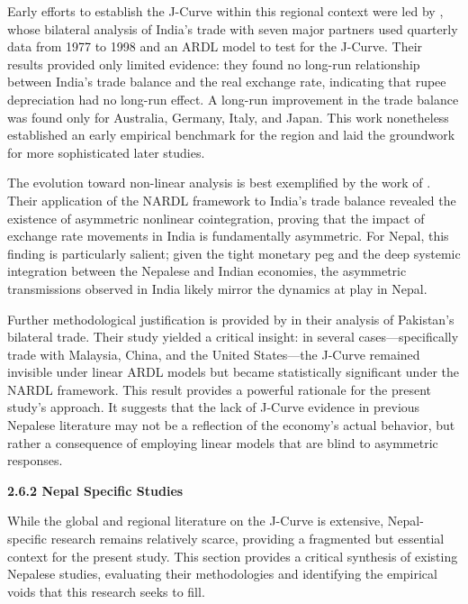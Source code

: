 \documentclass[12pt]{article}
\begin{document}
Early efforts to establish the J-Curve within this regional context were led by \textcite{Arora2003-yu}, whose bilateral analysis of India's trade with seven major partners used quarterly data from 1977 to 1998 and an ARDL model to test for the J-Curve. Their results provided only limited evidence: they found no long-run relationship between India's trade balance and the real exchange rate, indicating that rupee depreciation had no long-run effect. A long-run improvement in the trade balance was found only for Australia, Germany, Italy, and Japan. This work nonetheless established an early empirical benchmark for the region and laid the groundwork for more sophisticated later studies.

The evolution toward non-linear analysis is best exemplified by the work of \textcite{Bhat2021-ux}. Their application of the NARDL framework to India's trade balance revealed the existence of asymmetric nonlinear cointegration, proving that the impact of exchange rate movements in India is fundamentally asymmetric. For Nepal, this finding is particularly salient; given the tight monetary peg and the deep systemic integration between the Nepalese and Indian economies, the asymmetric transmissions observed in India likely mirror the dynamics at play in Nepal.

Further methodological justification is provided by \textcite{Iqbal2021-pu} in their analysis of Pakistan's bilateral trade. Their study yielded a critical insight: in several cases—specifically trade with Malaysia, China, and the United States—the J-Curve remained invisible under linear ARDL models but became statistically significant under the NARDL framework. This result provides a powerful rationale for the present study's approach. It suggests that the lack of J-Curve evidence in previous Nepalese literature may not be a reflection of the economy's actual behavior, but rather a consequence of employing linear models that are blind to asymmetric responses.

\vspace{0.5cm}
\noindent\textbf{2.6.2 Nepal Specific Studies}

While the global and regional literature on the J-Curve is extensive, Nepal-specific research remains relatively scarce, providing a fragmented but essential context for the present study. This section provides a critical synthesis of existing Nepalese studies, evaluating their methodologies and identifying the empirical voids that this research seeks to fill.
\end{document}
